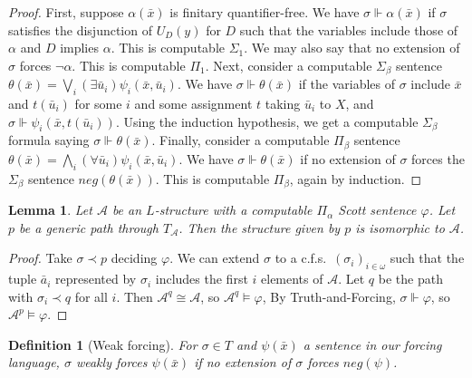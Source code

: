 \documentclass{article}
\newtheorem{lem}[thm]{Lemma}
\newtheorem{defn}{Definition}
\begin{document}
\begin{proof}

First, suppose $\alpha(\bar{x})$ is finitary quantifier-free.  We have
$\sigma\Vdash\alpha(\bar{x})$ if $\sigma$ satisfies the disjunction of $U_D(y)$ for $D$ such that the variables include those of $\alpha$ and $D$ implies $\alpha$.  This is computable $\Sigma_1$.  We may also say that no extension of $\sigma$ forces $\neg{\alpha}$.  This is computable $\Pi_1$.
Next, consider a computable $\Sigma_\beta$ sentence $\theta(\bar{x}) = \bigvee_i(\exists\bar{u}_i)\psi_i(\bar{x},\bar{u}_i)$.  We have $\sigma\Vdash\theta(\bar{x})$ if the variables of $\sigma$ include $\bar{x}$ and $t(\bar{u}_i)$ for some $i$ and some assignment $t$ taking $\bar{u}_i$ to $X$, and $\sigma\Vdash\psi_i(\bar{x},t(\bar{u}_i))$.  Using the induction hypothesis, we get a computable $\Sigma_\beta$ formula saying $\sigma\Vdash\theta(\bar{x})$.  
Finally, consider a computable $\Pi_\beta$ sentence $\theta(\bar{x}) = \bigwedge_i(\forall\bar{u}_i)\psi_i(\bar{x},\bar{u}_i)$.  We have $\sigma\Vdash\theta(\bar{x})$ if no extension of $\sigma$ forces the $\Sigma_\beta$ sentence $neg(\theta(\bar{x}))$.  This is computable $\Pi_\beta$, again by induction.
\end{proof} 

\begin{lem}

Let $\mathcal{A}$ be an $L$-structure with a computable $\Pi_\alpha$ Scott sentence $\varphi$.  Let $p$ be a generic path through $T_\mathcal{A}$.  Then the structure given by $p$ is isomorphic to $\mathcal{A}$.  

\end{lem}

\begin{proof}  

Take $\sigma\prec p$ deciding $\varphi$.  We can extend $\sigma$ to a c.f.s.\ $(\sigma_i)_{i\in\omega}$ such that the tuple $\bar{a}_i$ represented by $\sigma_i$ includes the first $i$ elements of $\mathcal{A}$.  Let $q$ be the path with $\sigma_i\prec q$ for all $i$.  Then $\mathcal{A}^q\cong\mathcal{A}$, so $\mathcal{A}^q\models\varphi$,  By Truth-and-Forcing, $\sigma\Vdash\varphi$, so $\mathcal{A}^p\models\varphi$.  
\end{proof} 

\begin{defn} [Weak forcing]

For $\sigma\in T$ and $\psi(\bar{x})$ a sentence in our forcing language, $\sigma$ \emph{weakly forces} $\psi(\bar{x})$ if no extension of $\sigma$ forces $neg(\psi)$.

\end{defn} 
\end{document}
